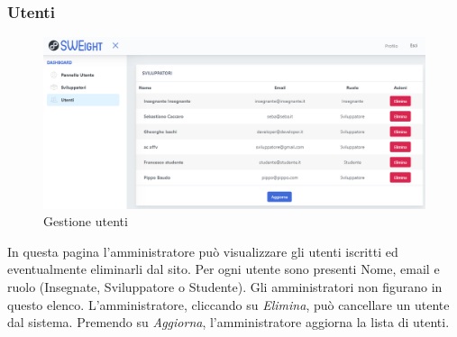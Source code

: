 		\subsubsection{Utenti}
			\begin{figure}[H]
				\centering
				\includegraphics[width=17cm]{sez/img/amministratore/gestisciutenti.PNG}
				\caption{Gestione utenti}\label{fig:1}
			\end{figure}
		  In questa pagina l'amministratore può visualizzare gli utenti iscritti ed eventualmente eliminarli dal sito. Per ogni utente sono presenti Nome, email e ruolo (Insegnate, Sviluppatore o Studente). Gli amministratori non figurano in questo elenco. L'amministratore, cliccando su \textit{Elimina}, può cancellare un utente dal sistema. Premendo su \textit{Aggiorna}, l'amministratore aggiorna la lista di utenti.
